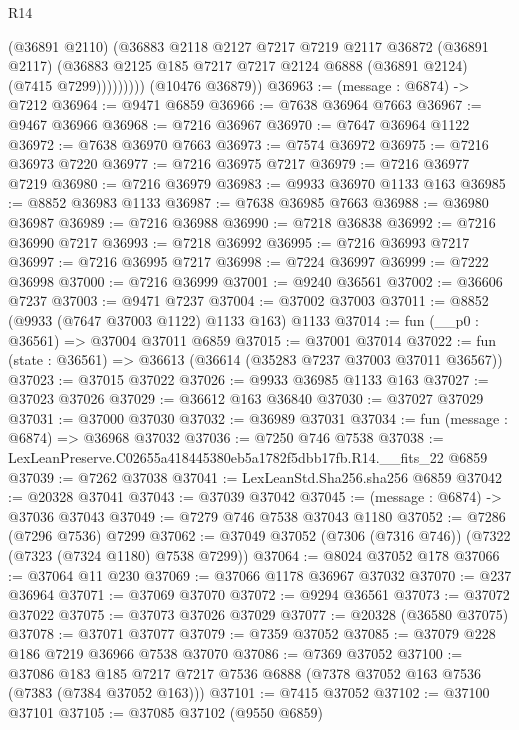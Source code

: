 \begin{lexlean}{R14}
\begin{coremodule}
                  (@36891 @2110)
                  (@36883
                    @2118
                    @2127
                    @7217
                    @7219
                    @2117
                    @36872
                    (@36891 @2117)
                    (@36883 @2125 @185 @7217 @7217 @2124 @6888 (@36891 @2124) (@7415 @7299)))))))))
      (@10476 @36879))
@36963 := (message : @6874) -> @7212
@36964 := @9471 @6859
@36966 := @7638 @36964 @7663
@36967 := @9467 @36966
@36968 := @7216 @36967
@36970 := @7647 @36964 @1122
@36972 := @7638 @36970 @7663
@36973 := @7574 @36972
@36975 := @7216 @36973 @7220
@36977 := @7216 @36975 @7217
@36979 := @7216 @36977 @7219
@36980 := @7216 @36979
@36983 := @9933 @36970 @1133 @163
@36985 := @8852 @36983 @1133
@36987 := @7638 @36985 @7663
@36988 := @36980 @36987
@36989 := @7216 @36988
@36990 := @7218 @36838
@36992 := @7216 @36990 @7217
@36993 := @7218 @36992
@36995 := @7216 @36993 @7217
@36997 := @7216 @36995 @7217
@36998 := @7224 @36997
@36999 := @7222 @36998
@37000 := @7216 @36999
@37001 := @9240 @36561
@37002 := @36606 @7237
@37003 := @9471 @7237
@37004 := @37002 @37003
@37011 := @8852 (@9933 (@7647 @37003 @1122) @1133 @163) @1133
@37014 := fun (__p0 : @36561) => @37004 @37011 @6859
@37015 := @37001 @37014
@37022 := fun (state : @36561) => @36613 (@36614 (@35283 @7237 @37003 @37011 @36567))
@37023 := @37015 @37022
@37026 := @9933 @36985 @1133 @163
@37027 := @37023 @37026
@37029 := @36612 @163 @36840
@37030 := @37027 @37029
@37031 := @37000 @37030
@37032 := @36989 @37031
@37034 := fun (message : @6874) => @36968 @37032
@37036 := @7250 @746 @7538
@37038 := LexLeanPreserve.C02655a418445380eb5a1782f5dbb17fb.R14.__fits_22 @6859
@37039 := @7262 @37038
@37041 := LexLeanStd.Sha256.sha256 @6859
@37042 := @20328 @37041
@37043 := @37039 @37042
@37045 := (message : @6874) -> @37036 @37043
@37049 := @7279 @746 @7538 @37043 @1180
@37052 := @7286 (@7296 @7536) @7299
@37062 := @37049 @37052 (@7306 (@7316 @746)) (@7322 (@7323 (@7324 @1180) @7538 @7299))
@37064 := @8024 @37052 @178
@37066 := @37064 @11 @230
@37069 := @37066 @1178 @36967 @37032
@37070 := @237 @36964
@37071 := @37069 @37070
@37072 := @9294 @36561
@37073 := @37072 @37022
@37075 := @37073 @37026 @37029
@37077 := @20328 (@36580 @37075)
@37078 := @37071 @37077
@37079 := @7359 @37052
@37085 := @37079 @228 @186 @7219 @36966 @7538 @37070
@37086 := @7369 @37052
@37100 := @37086
    @183
    @185
    @7217
    @7217
    @7536
    @6888
    (@7378 @37052 @163 @7536 (@7383 (@7384 @37052 @163)))
@37101 := @7415 @37052
@37102 := @37100 @37101
@37105 := @37085 @37102 (@9550 @6859)

\end{coremodule}
\end{lexlean}
